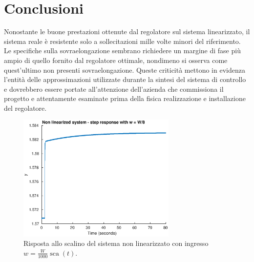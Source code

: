 \documentclass[a4paper]{article}
\DeclareMathOperator*{\sca}{\textrm{sca}}
\begin{document}
\section{Conclusioni}
Nonostante le buone prestazioni ottenute dal regolatore sul sistema linearizzato, il sistema reale è resistente solo a sollecitazioni mille volte minori del riferimento.
Le specifiche sulla sovraelongazione sembrano richiedere un margine di fase più ampio di quello fornito dal regolatore ottimale, nondimeno si osserva come quest'ultimo non presenti sovraelongazione.
Queste criticità mettono in evidenza l'entità delle approssimazioni utilizzate durante la sintesi del sistema di controllo e dovrebbero essere portate all'attenzione dell'azienda che commissiona il progetto e attentamente esaminate prima della fisica realizzazione e installazione del regolatore.
\begin{figure}[h]
    \centering
    \includegraphics[width=0.7\textwidth]{step_nonlin_long}
    \caption{Risposta allo scalino del sistema non linearizzato con ingresso $w = \frac{W}{1000} \sca (t)$.}
    \label{fig:step_sim_nonlin_long}
\end{figure}
\end{document}
